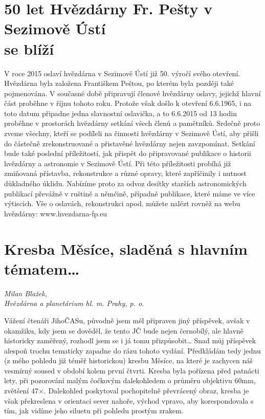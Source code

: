\documentclass[10pt,a5paper,twoside]{book}
\newcommand{\autor}[1]{
	\begin{flushright}
	\textit{#1}
	\end{flushright}
}
\begin{document}
\newpage
\section*{50 let Hvězdárny Fr. Pešty v Sezimově Ústí \\se blíží}
V roce 2015 oslaví hvězdárna v Sezimově Ústí již 50. výročí svého otevření. Hvězdárna byla založena Františkem Peštou, po kterém byla později také pojmenována. V současné době připravují členové hvězdárny oslavy, jejichž hlavní část proběhne v říjnu tohoto roku. Protože však došlo k otevření 6.6.1965, i na toto datum připadne jedna slavnostní oslavička, a to 6.6.2015 od 13 hodin proběhne v prostorách hvězdárny setkání všech členů a pamětníků. Srdečně proto zveme všechny, kteří se podíleli na činnosti hvězdárny v Sezimově Ústí, aby přišli do částečně zrekonstruované a přistavěné hvězdárny nejen zavzpomínat. Setkání bude také poslední příležitostí, jak přispět do připravované publikace o historii hvězdárny a astronomie v Sezimově Ústí.
Při této příležitosti probíhá již zmiňovaná přístavba, rekonstrukce a různé opravy, které zapříčinily i nutnost důkladného úklidu. Nabízíme proto za odvoz desítky starších astronomických publikací převážně v ruštině a němčině, případně publikace, které máme ve více výtiscích.
Vše o oslavách, rekonstrukci apod. můžete nalézt rovněž na webu hvězdárny:  www.hvezdarna-fp.eu

\section*{Kresba Měsíce, sladěná s hlavním tématem…}
\autor{Milan Blažek,\\
 Hvězdárna a planetárium hl. m. Prahy, p. o.}

Vážení čtenáři JihoČASu, původně jsem měl připraven jiný příspěvek, avšak v okamžiku, kdy jsem se dověděl, že tento JČ bude nejen černobílý, ale hlavně historicky zaměřený, rozhodl jsem se i já tomu přizpůsobit… Snad můj příspěvek alespoň trochu tematicky zapadne do rázu tohoto vydání.
Předkládám tedy jednu (z mého pohledu již téměř historickou) kresbu Měsíce, na které je zachycen náš vesmírný soused v období kolem první čtvrti.
Kresba byla pořízena před patnácti lety, při pozorování malým čočkovým dalekohledem o průměru objektivu 60mm, zvětšení 47$\times$. Dalekohled poskytoval pochopitelně převrácený obraz, kresba je však překreslena v orientaci sever nahoře, východ vpravo, aby korespondovala s tím, jak vidíme jeho siluetu při pohledu prostým zrakem.


\end{document}
